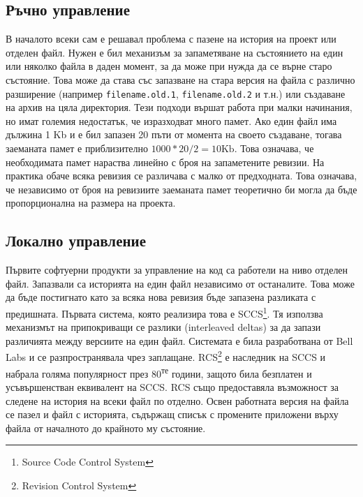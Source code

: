 \documentclass[a4paper]{article}
\begin{document}
  \subsection{Ръчно управление}
  В началото всеки сам е решавал проблема с пазене на история на проект или
  отделен файл. Нужен е бил механизъм за запаметяване на състоянието на един
  или няколко файла в даден момент, за да може при нужда да се върне старо
  състояние. Това може да става със запазване на стара версия на файла с
  различно разширение (например \texttt{filename.old.1},
  \texttt{filename.old.2} и т.н.) или създаване на архив на цяла директория.
  Тези подходи вършат работа при малки начинания, но имат големия недостатък, че
  изразходват много памет. Ако един файл има дължина 1 Kb и е бил запазен 20
  пъти от момента на своето създаване, тогава заеманата памет е приблизително
  $1000 * 20 / 2 = 10 \mathrm{Kb}$. Това означава, че необходимата памет нараства
  линейно с броя на запаметените ревизии. На практика обаче всяка
  ревизия се различава с малко от предходната. Това означава, че независимо от
  броя на ревизиите заеманата памет теоретично би могла да бъде пропорционална 
  на размера на проекта.

  \subsection{Локално управление}
  Първите софтуерни продукти за управление на код са работели на ниво отделен
  файл. Запазвали са историята на един файл независимо от останалите.  Това
  може да бъде постигнато като за всяка нова ревизия бъде запазена разликата
  с предишната. Първата система, която реализира това е SCCS\footnote{Source
  Code Control System\cite{sccs}}. Тя използва механизмът на припокриващи се
  разлики (interleaved deltas) за да запази различията между версиите на един
  файл. Системата е била разработвана от Bell Labs и се разпространявала чрез
  заплащане. RCS\footnote{Revision Control System\cite{rcs}} е наследник на
  SCCS и набрала голяма популярност през 80\textsuperscript{те} години, защото
  била безплатен и усъвършенстван еквивалент на SCCS. RCS също предоставяла
  възможност за следене на история на всеки файл по отделно. Освен работната
  версия на файла се пазел и файл с историята, съдържащ списък с промените
  приложени върху файла от началното до крайното му състояние.
\end{document}
